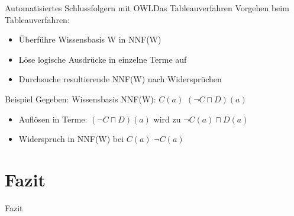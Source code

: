 \documentclass{beamer}
\begin{document}
\begin{frame}{Automatisiertes Schlussfolgern mit OWL}{Das Tableauverfahren}
Vorgehen beim Tableauverfahren:
\begin{itemize}
	\item Überführe Wissensbasis W in NNF(W)
	\item Löse logische Ausdrücke in einzelne Terme auf
	\item Durchsuche resultierende NNF(W) nach Widersprüchen
\end{itemize}
\begin{block}{Beispiel}
Gegeben: Wissensbasis NNF(W): $ C(a) $  $ (\neg C \sqcap D)(a) $
\begin{itemize}
	\item Auflösen in Terme: $ (\neg C \sqcap D)(a) $ wird zu $ \neg C(a) \sqcap D(a) $
	\item Widerspruch in NNF(W) bei $ C(a) $ $ \neg C(a) $ 
\end{itemize}
\end{block}	
\end{frame}

\section{Fazit}
\begin{frame}{Fazit}
\end{frame}
\end{document}
